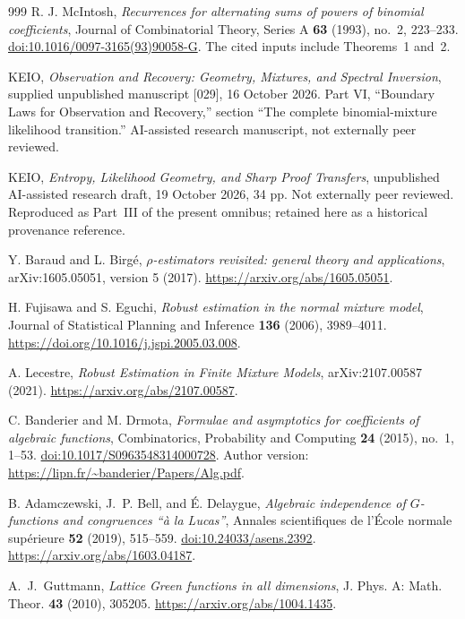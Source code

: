 \documentclass[11pt,a4paper]{article}
\theoremstyle{definition}
\theoremstyle{remark}
\numberwithin{equation}{section}
\begin{document}
\begin{thebibliography}{999}
R. J. McIntosh,
\emph{Recurrences for alternating sums of powers of binomial coefficients},
Journal of Combinatorial Theory, Series A \textbf{63}
(1993), no.~2, 223--233.
\href{https://doi.org/10.1016/0097-3165(93)90058-G}
{doi:10.1016/0097-3165(93)90058-G}.
The cited inputs include Theorems~1 and~2.

KEIO, \emph{Observation and Recovery: Geometry, Mixtures, and Spectral
Inversion}, supplied unpublished manuscript [029], 16 October 2026.
Part VI, ``Boundary Laws for Observation and Recovery,'' section
``The complete binomial-mixture likelihood transition.''
AI-assisted research manuscript, not externally peer reviewed.

KEIO, \emph{Entropy, Likelihood Geometry, and Sharp Proof Transfers},
unpublished AI-assisted research draft, 19 October 2026, 34 pp.
Not externally peer reviewed.
Reproduced as Part~III of the present omnibus; retained here as a historical provenance reference.

Y. Baraud and L. Birg\'e,
\emph{$\rho$-estimators revisited: general theory and applications},
arXiv:1605.05051, version 5 (2017).
\url{https://arxiv.org/abs/1605.05051}.

H. Fujisawa and S. Eguchi,
\emph{Robust estimation in the normal mixture model},
Journal of Statistical Planning and Inference \textbf{136} (2006),
3989--4011.
\url{https://doi.org/10.1016/j.jspi.2005.03.008}.

A. Lecestre,
\emph{Robust Estimation in Finite Mixture Models},
arXiv:2107.00587 (2021).
\url{https://arxiv.org/abs/2107.00587}.

C. Banderier and M. Drmota,
\emph{Formulae and asymptotics for coefficients of algebraic functions},
Combinatorics, Probability and Computing \textbf{24} (2015), no.~1, 1--53.
\href{https://doi.org/10.1017/S0963548314000728}{doi:10.1017/S0963548314000728}.
Author version: \url{https://lipn.fr/~banderier/Papers/Alg.pdf}.

B. Adamczewski, J.~P. Bell, and \'E. Delaygue,
\emph{Algebraic independence of $G$-functions and congruences
``\`a la Lucas''},
Annales scientifiques de l'\'Ecole normale sup\'erieure
\textbf{52} (2019), 515--559.
\href{https://doi.org/10.24033/asens.2392}{doi:10.24033/asens.2392}.
\url{https://arxiv.org/abs/1603.04187}.

A.~J.~Guttmann, \emph{Lattice Green functions in all dimensions},
J. Phys. A: Math. Theor. \textbf{43} (2010), 305205.
\url{https://arxiv.org/abs/1004.1435}.


\end{thebibliography}
\end{document}
